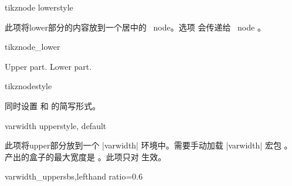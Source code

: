 \begin{docTcbKey}{tikznode lower}{}{style}

此项将lower部分的内容放到一个居中的 \tikzname\  node。选项  会传递给 \tikzname\  node 。
\begin{exdispExample}{tikznode_lower}
\begin{tcolorbox}[bicolor,colback=LightBlue!50!white,colbacklower=white,
  colframe=black,tikznode lower={inner sep=2pt,draw=red,fill=yellow}]
Upper part.
\tcblower
Lower part.
\end{tcolorbox}
\end{exdispExample}
\end{docTcbKey}



\begin{docTcbKey}{tikznode}{}{style}

同时设置  和  的简写形式。
\end{docTcbKey}

\begin{docTcbKey}{varwidth upper}{}{style, default }


此项将upper部分放到一个 |varwidth| 环境中。需要手动加载 |varwidth| 宏包 %
。产出的盒子的最大宽度是 。此项只对  生效。
\begin{exdispExample*}{varwidth_upper}{sbs,lefthand ratio=0.6}

\end{exdispExample*}
\end{docTcbKey}






